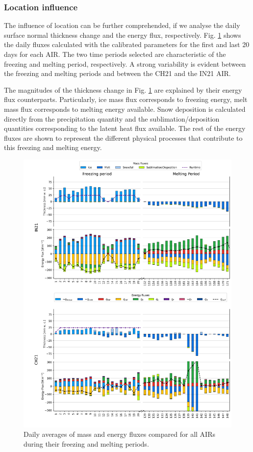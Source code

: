 \documentclass[utf8]{frontiersSCNS} %
\begin{document}
\subsubsection{Location influence}

The influence of location can be further comprehended, if we analyse the daily surface normal thickness change and the
energy flux, respectively. Fig.  \ref{fig:MEB} shows the daily fluxes calculated with the calibrated parameters for
the first and last 20 days for each AIR. The two time periods selected are characteristic of the freezing and
melting period, respectively. A strong variability is evident between the freezing and melting periods and between
the CH21 and the IN21 AIR.

The magnitudes of the thickness change in Fig. \ref{fig:MEB} are explained by their energy flux counterparts. Particularly,
ice mass flux corresponds to freezing energy, melt mass flux corresponds to melting energy available.
Snow deposition is calculated directly from the precipitation quantity and the sublimation/deposition quantities corresponding to
the latent heat flux available. The rest of the energy fluxes are shown to represent the different physical
processes that contribute to this freezing and melting energy.

\begin{figure}
	\begin{center}
		\includegraphics[width=\linewidth]{Figures/mass_energy_bal.jpg} \end{center}
	\caption{Daily averages of mass and energy fluxes compared for all AIRs during their freezing and melting periods.
	} \label{fig:MEB}
\end{figure}
\end{document}
